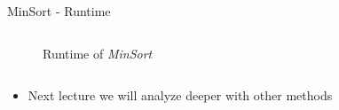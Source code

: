 \begin{frame}{MinSort - Runtime}
\begin{columns}
\begin{column}{0.5\textwidth}
\begin{center}
\begin{figure}
          \vspace*{-1.0em}\caption{Runtime of \textit{MinSort}}%
          \label{fig:minsort_runtime_2}%
        \end{figure}%
      \end{center}
    \end{column}%
  \end{columns}
  \begin{columns}
    \begin{column}{1.0\textwidth}
      \begin{itemize}
        \item
          Next lecture we will analyze deeper with other methods
      \end{itemize}
    \end{column}
    \begin{column}{0.0\textwidth}\end{column}
  \end{columns}
\end{frame}